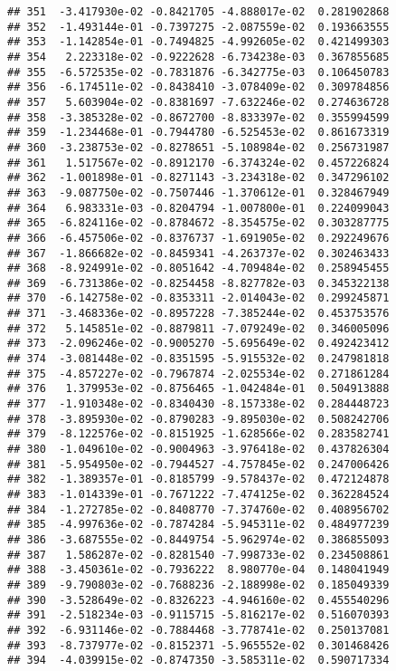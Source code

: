 \documentclass[
]{article}
\begin{document}
\begin{verbatim}
## 351  -3.417930e-02 -0.8421705 -4.888017e-02  0.281902868
## 352  -1.493144e-01 -0.7397275 -2.087559e-02  0.193663555
## 353  -1.142854e-01 -0.7494825 -4.992605e-02  0.421499303
## 354   2.223318e-02 -0.9222628 -6.734238e-03  0.367855685
## 355  -6.572535e-02 -0.7831876 -6.342775e-03  0.106450783
## 356  -6.174511e-02 -0.8438410 -3.078409e-02  0.309784856
## 357   5.603904e-02 -0.8381697 -7.632246e-02  0.274636728
## 358  -3.385328e-02 -0.8672700 -8.833397e-02  0.355994599
## 359  -1.234468e-01 -0.7944780 -6.525453e-02  0.861673319
## 360  -3.238753e-02 -0.8278651 -5.108984e-02  0.256731987
## 361   1.517567e-02 -0.8912170 -6.374324e-02  0.457226824
## 362  -1.001898e-01 -0.8271143 -3.234318e-02  0.347296102
## 363  -9.087750e-02 -0.7507446 -1.370612e-01  0.328467949
## 364   6.983331e-03 -0.8204794 -1.007800e-01  0.224099043
## 365  -6.824116e-02 -0.8784672 -8.354575e-02  0.303287775
## 366  -6.457506e-02 -0.8376737 -1.691905e-02  0.292249676
## 367  -1.866682e-02 -0.8459341 -4.263737e-02  0.302463433
## 368  -8.924991e-02 -0.8051642 -4.709484e-02  0.258945455
## 369  -6.731386e-02 -0.8254458 -8.827782e-03  0.345322138
## 370  -6.142758e-02 -0.8353311 -2.014043e-02  0.299245871
## 371  -3.468336e-02 -0.8957228 -7.385244e-02  0.453753576
## 372   5.145851e-02 -0.8879811 -7.079249e-02  0.346005096
## 373  -2.096246e-02 -0.9005270 -5.695649e-02  0.492423412
## 374  -3.081448e-02 -0.8351595 -5.915532e-02  0.247981818
## 375  -4.857227e-02 -0.7967874 -2.025534e-02  0.271861284
## 376   1.379953e-02 -0.8756465 -1.042484e-01  0.504913888
## 377  -1.910348e-02 -0.8340430 -8.157338e-02  0.284448723
## 378  -3.895930e-02 -0.8790283 -9.895030e-02  0.508242706
## 379  -8.122576e-02 -0.8151925 -1.628566e-02  0.283582741
## 380  -1.049610e-02 -0.9004963 -3.976418e-02  0.437826304
## 381  -5.954950e-02 -0.7944527 -4.757845e-02  0.247006426
## 382  -1.389357e-01 -0.8185799 -9.578437e-02  0.472124878
## 383  -1.014339e-01 -0.7671222 -7.474125e-02  0.362284524
## 384  -1.272785e-02 -0.8408770 -7.374760e-02  0.408956702
## 385  -4.997636e-02 -0.7874284 -5.945311e-02  0.484977239
## 386  -3.687555e-02 -0.8449754 -5.962974e-02  0.386855093
## 387   1.586287e-02 -0.8281540 -7.998733e-02  0.234508861
## 388  -3.450361e-02 -0.7936222  8.980770e-04  0.148041949
## 389  -9.790803e-02 -0.7688236 -2.188998e-02  0.185049339
## 390  -3.528649e-02 -0.8326223 -4.946160e-02  0.455540296
## 391  -2.518234e-03 -0.9115715 -5.816217e-02  0.516070393
## 392  -6.931146e-02 -0.7884468 -3.778741e-02  0.250137081
## 393  -8.737977e-02 -0.8152371 -5.965552e-02  0.301468426
## 394  -4.039915e-02 -0.8747350 -3.585311e-02  0.590717334

\end{verbatim}
\end{document}
